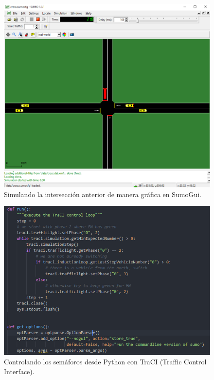 \begin{figure}[h]
    \centering
\includegraphics[width=\textwidth]{sumo/f06ad63e2235a639007f9748f2326f91.png}
    \caption{Simulando la intersección anterior de manera gráfica en SumoGui.}
    \label{fig:sumogui1}
\end{figure}

\begin{figure}[h]
    \centering
\includegraphics[width=\textwidth]{sumo/8a185a540ef5e98b250d7c70216cddfc.png}
    \caption{Controlando los semáforos desde Python con TraCI (Traffic Control Interface).}
    \label{fig:traci1}
\end{figure}

